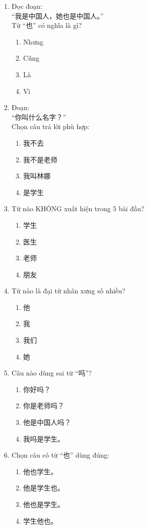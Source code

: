\documentclass{article}
\begin{document}
\begin{CJK*}{UTF8}{gbsn}
\begin{multicols}{2}
\begin{enumerate}[label=\textbf{Câu \arabic*.}, leftmargin=*, itemsep=1.2em]
\item Đọc đoạn: \\
“我是中国人，她也是中国人。” \\
Từ “也” có nghĩa là gì?
\begin{enumerate}[label=A.]
\item Nhưng
\item Cũng
\item Là
\item Vì
\end{enumerate}

\item Đoạn: \\
“你叫什么名字？” \\
Chọn câu trả lời phù hợp:
\begin{enumerate}[label=A.]
\item 我不去
\item 我不是老师
\item 我叫林娜
\item 是学生
\end{enumerate}

\item Từ nào KHÔNG xuất hiện trong 5 bài đầu?
\begin{enumerate}[label=A.]
\item 学生
\item 医生
\item 老师
\item 朋友
\end{enumerate}

\item Từ nào là đại từ nhân xưng số nhiều?
\begin{enumerate}[label=A.]
\item 他
\item 我
\item 我们
\item 她
\end{enumerate}%
\item Câu nào dùng sai từ “吗”?
\begin{enumerate}[label=A.]
\item 你好吗？
\item 你是老师吗？
\item 他是中国人吗？
\item 我吗是学生。
\end{enumerate}

\item Chọn câu có từ “也” dùng đúng:
\begin{enumerate}[label=A.]
\item 他也学生。
\item 他是学生也。
\item 他也是学生。
\item 学生他也。
\end{enumerate}


\end{enumerate}
\end{multicols}
\end{CJK*}
\end{document}
